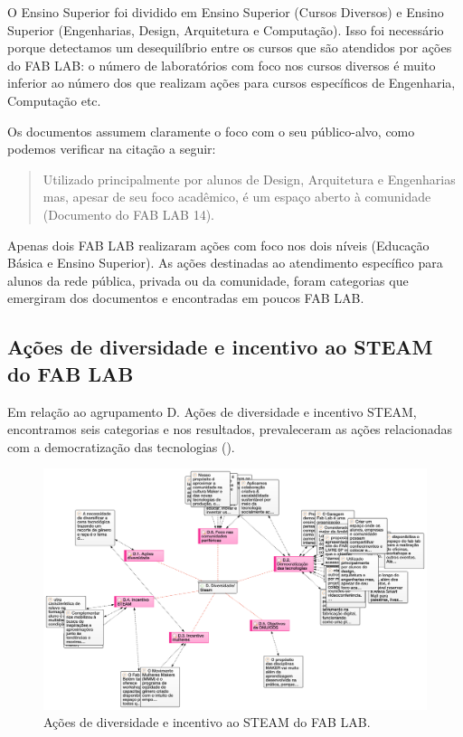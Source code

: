 \documentclass[portuguese]{textolivre}
\begin{document}
O Ensino Superior foi dividido em Ensino Superior (Cursos Diversos) e Ensino Superior (Engenharias, Design, Arquitetura e Computação). Isso foi necessário porque detectamos um desequilíbrio entre os cursos que são atendidos por ações do FAB LAB: o número de laboratórios com foco nos cursos diversos é muito inferior ao número dos que realizam ações para cursos específicos de Engenharia, Computação etc.

Os documentos assumem claramente o foco com o seu público-alvo, como podemos verificar na citação a seguir:

\begin{quote}
    Utilizado principalmente por alunos de Design, Arquitetura e Engenharias mas, apesar de seu foco acadêmico, é um espaço aberto à comunidade (Documento do FAB LAB 14).
\end{quote}

Apenas dois FAB LAB realizaram ações com foco nos dois níveis (Educação Básica e Ensino Superior). As ações destinadas ao atendimento específico para alunos da rede pública, privada ou da comunidade, foram categorias que emergiram dos documentos e encontradas em poucos FAB LAB.

\subsection{Ações de diversidade e incentivo ao STEAM do FAB LAB}\label{sec-organizacao-latex}
Em relação ao agrupamento D. Ações de diversidade e incentivo STEAM, encontramos seis categorias e nos resultados, prevaleceram as ações relacionadas com a democratização das tecnologias ().

\begin{figure}[htbp]
\centering
\begin{minipage}{\textwidth}
\includegraphics[width=\linewidth]{Fig6.png}
\caption{Ações de diversidade e incentivo ao STEAM do FAB LAB.}
\label{fig6}
\end{minipage}
\end{figure}
\end{document}
